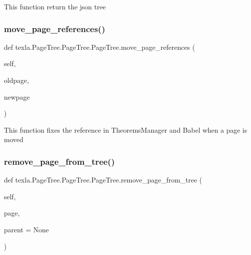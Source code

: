 \begin{DoxyVerb}This function return the json tree\end{DoxyVerb}
 \hypertarget{classtexla_1_1PageTree_1_1PageTree_1_1PageTree_a0eefaf0f844683ae949fa1120f9179d3}{}\label{classtexla_1_1PageTree_1_1PageTree_1_1PageTree_a0eefaf0f844683ae949fa1120f9179d3} 
\subsubsection{\texorpdfstring{move\+\_\+page\+\_\+references()}{move\_page\_references()}}
{\footnotesize\ttfamily def texla.\+Page\+Tree.\+Page\+Tree.\+Page\+Tree.\+move\+\_\+page\+\_\+references (\begin{DoxyParamCaption}\item[{}]{self,  }\item[{}]{oldpage,  }\item[{}]{newpage }\end{DoxyParamCaption})}

\begin{DoxyVerb}This function fixes the reference in TheoremsManager
and Babel when a page is moved\end{DoxyVerb}
 \hypertarget{classtexla_1_1PageTree_1_1PageTree_1_1PageTree_a4766b39f5fa963645b80afbb52c2c051}{}\label{classtexla_1_1PageTree_1_1PageTree_1_1PageTree_a4766b39f5fa963645b80afbb52c2c051} 
\subsubsection{\texorpdfstring{remove\+\_\+page\+\_\+from\+\_\+tree()}{remove\_page\_from\_tree()}}
{\footnotesize\ttfamily def texla.\+Page\+Tree.\+Page\+Tree.\+Page\+Tree.\+remove\+\_\+page\+\_\+from\+\_\+tree (\begin{DoxyParamCaption}\item[{}]{self,  }\item[{}]{page,  }\item[{}]{parent = {\ttfamily None} }\end{DoxyParamCaption})}

